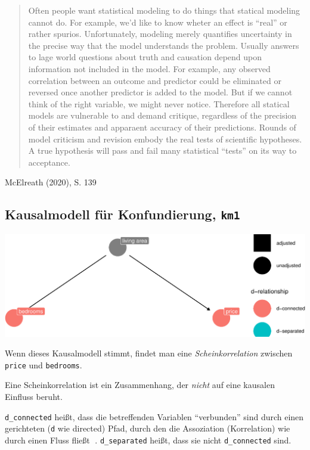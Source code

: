 \documentclass[
  a4paper,
  DIV=11]{scrreprt}
\theoremstyle{definition}
\theoremstyle{remark}
\begin{document}
\begin{quote}
Often people want statistical modeling to do things that statical
modeling cannot do. For example, we'd like to know wheter an effect is
``real'' or rather spurios. Unfortunately, modeling merely quantifies
uncertainty in the precise way that the model understands the problem.
Usually answers to lage world questions about truth and causation depend
upon information not included in the model. For example, any observed
correlation between an outcome and predictor could be eliminated or
reversed once another predictor is added to the model. But if we cannot
think of the right variable, we might never notice. Therefore all
statical models are vulnerable to and demand critique, regardless of the
precision of their estimates and apparaent accuracy of their
predictions. Rounds of model criticism and revision embody the real
tests of scientific hypotheses. A true hypothesis will pass and fail
many statistical ``tests'' on its way to acceptance.
\end{quote}

McElreath (2020), S. 139

\hypertarget{kausalmodell-fuxfcr-konfundierung-km1}{%
\subsection{\texorpdfstring{Kausalmodell für Konfundierung,
\texttt{km1}}{Kausalmodell für Konfundierung, km1}}\label{kausalmodell-fuxfcr-konfundierung-km1}}

\includegraphics{./kausal_files/figure-pdf/km1-1.pdf}

Wenn dieses Kausalmodell stimmt, findet man eine
\emph{Scheinkorrelation} zwischen \texttt{price} und \texttt{bedrooms}.

Eine Scheinkorrelation ist ein Zusammenhang, der \emph{nicht} auf eine
kausalen Einfluss beruht.

\texttt{d\_connected} heißt, dass die betreffenden Variablen
``verbunden'' sind durch einen gerichteten (\texttt{d} wie directed)
Pfad, durch den die Assoziation (Korrelation) wie durch einen Fluss
fließt 🌊. \texttt{d\_separated} heißt, dass sie nicht
\texttt{d\_connected} sind.
\end{document}
